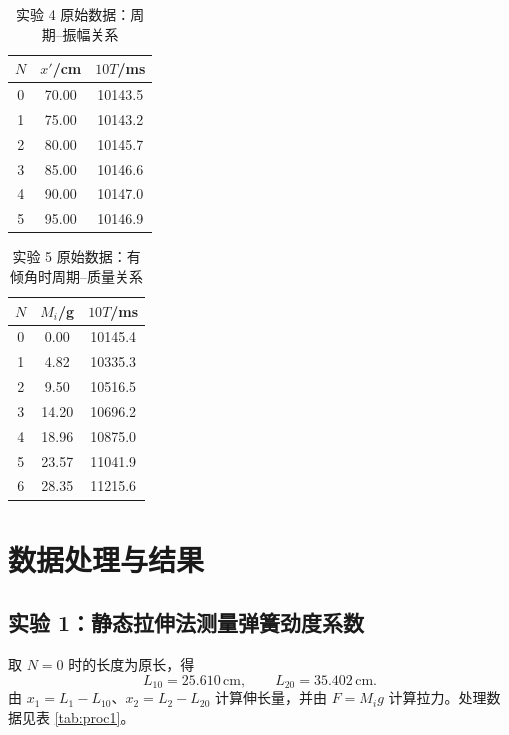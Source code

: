 \documentclass[UTF8,zihao=-4]{ctexart}
\begin{document}
\begin{table}[H]
\centering
\small
\caption{实验 4 原始数据：周期--振幅关系}
\label{tab:raw4}
\begin{tabular}{ccc}
\toprule
$N$ & $x'$/cm & $10T$/ms \\
\midrule
0 & 70.00 & 10143.5 \\
1 & 75.00 & 10143.2 \\
2 & 80.00 & 10145.7 \\
3 & 85.00 & 10146.6 \\
4 & 90.00 & 10147.0 \\
5 & 95.00 & 10146.9 \\
\bottomrule
\end{tabular}
\end{table}

\begin{table}[H]
\centering
\small
\caption{实验 5 原始数据：有倾角时周期--质量关系}
\label{tab:raw5}
\begin{tabular}{ccc}
\toprule
$N$ & $M_i$/g & $10T$/ms \\
\midrule
0 & 0.00 & 10145.4 \\
1 & 4.82 & 10335.3 \\
2 & 9.50 & 10516.5 \\
3 & 14.20 & 10696.2 \\
4 & 18.96 & 10875.0 \\
5 & 23.57 & 11041.9 \\
6 & 28.35 & 11215.6 \\
\bottomrule
\end{tabular}
\end{table}

\section{数据处理与结果}

\subsection{实验 1：静态拉伸法测量弹簧劲度系数}
取 $N=0$ 时的长度为原长，得
\begin{equation}
  L_{10}=25.610\,\mathrm{cm},\qquad L_{20}=35.402\,\mathrm{cm} .
\end{equation}
由 $x_1=L_1-L_{10}$、$x_2=L_2-L_{20}$ 计算伸长量，并由 $F=M_ig$ 计算拉力。处理数据见表 \ref{tab:proc1}。
\end{document}
